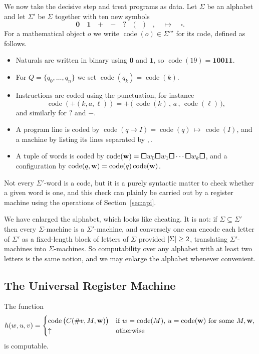 \documentclass[a4paper]{scrartcl}
\newcommand{\code}{\operatorname{code}}
\begin{document}
We now take the decisive step and treat programs as data. Let $\Sigma$ be an alphabet and let $\Sigma'$ be $\Sigma$ together with ten new symbols
$$\bm{0} \quad \bm{1} \quad \bm{+} \quad \bm{-} \quad \bm{?} \quad \bm{(} \quad \bm{)} \quad \bm{,} \quad \bm{\mapsto} \quad \bm{\square}.$$
For a mathematical object $o$ we write $\code(o) \in \Sigma'^\star$ for its code, defined as follows.
\begin{itemize}
	\item Naturals are written in binary using $\bm 0$ and $\bm 1$, so $\code(19) = \bm1\bm0\bm0\bm1\bm1$.
	\item For $Q = \{q_0, \dots, q_n\}$ we set $\code(q_k) = \code(k)$.
	\item Instructions are coded using the punctuation, for instance
	$$\code(+(k,a,\ell)) = \bm+\,\bm(\,\code(k)\,\bm,\,a\,\bm,\,\code(\ell)\,\bm),$$
	and similarly for $?$ and $-$.
	\item A program line is coded by $\code(q\mapsto I) = \code(q)\,\bm\mapsto\,\code(I)$, and a machine by listing its lines separated by $\bm,$.
	\item A tuple of words is coded by $\code(\vv w) = \bm\square w_0 \bm\square w_1 \bm\square \cdots \bm\square w_k \bm\square$, and a configuration by $\code(q,\vv w) = \code(q)\code(\vv w)$.
\end{itemize}
Not every $\Sigma'$-word is a code, but it is a purely syntactic matter to check whether a given word is one, and this check can plainly be carried out by a register machine using the operations of Section~\ref{sec:api}.

\begin{remark}
	We have enlarged the alphabet, which looks like cheating. It is not: if $\Sigma \subseteq \Sigma'$ then every $\Sigma$-machine is a $\Sigma'$-machine, and conversely one can encode each letter of $\Sigma'$ as a fixed-length block of letters of $\Sigma$ provided $\lvert\Sigma\rvert\geq 2$, translating $\Sigma'$-machines into $\Sigma$-machines. So computability over any alphabet with at least two letters is the same notion, and we may enlarge the alphabet whenever convenient.
\end{remark}

\subsection{The Universal Register Machine}

\begin{lemma}\label{lem:stepfunction}
	The function
	$$h(w,u,v) = \begin{cases} \code\big(C(\#v, M, \vv w)\big) & \text{if } w = \code(M),\, u = \code(\vv w) \text{ for some } M, \vv w, \\ \uparrow & \text{otherwise}\end{cases}$$
	is computable.
\end{lemma}
\end{document}
